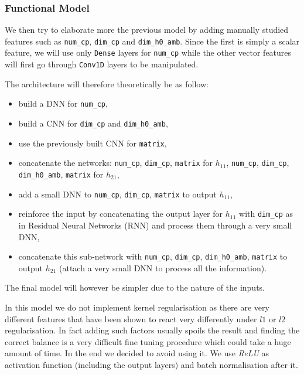    \subsubsection{Functional Model}
        We then try to elaborate more the previous model by adding manually studied features such as \texttt{num\_cp}, \texttt{dim\_cp} and \texttt{dim\_h0\_amb}. Since the first is simply a scalar feature, we will use only \texttt{Dense} layers for \texttt{num\_cp} while the other vector features will first go through \texttt{Conv1D} layers to be manipulated.
        
        The architecture will therefore theoretically be as follow:
        \begin{itemize}
            \item build a DNN for \texttt{num\_cp},
            \item build a CNN for \texttt{dim\_cp} and \texttt{dim\_h0\_amb},
            \item use the previously built CNN for \texttt{matrix},
            \item concatenate the networks:
                \subitem \texttt{num\_cp}, \texttt{dim\_cp}, \texttt{matrix} for $h_{11}$,
                \subitem \texttt{num\_cp}, \texttt{dim\_cp}, \texttt{dim\_h0\_amb}, \texttt{matrix} for $h_{21}$,
            \item add a small DNN to \texttt{num\_cp}, \texttt{dim\_cp}, \texttt{matrix} to output $h_{11}$,
            \item reinforce the input by concatenating the output layer for $h_{11}$ with \texttt{dim\_cp} as in Residual Neural Networks (RNN) and process them through a very small DNN,
            \item concatenate this sub-network with \texttt{num\_cp}, \texttt{dim\_cp}, \texttt{dim\_h0\_amb}, \texttt{matrix} to output $h_{21}$ (attach a very small DNN to process all the information).
        \end{itemize}
        The final model will however be simpler due to the nature of the inputs.
        
        In this model we do not implement kernel regularisation as there are very different features that have been shown to react very differently under $l1$ or $l2$ regularisation. In fact adding such factors usually spoils the result and finding the correct balance is a very difficult fine tuning procedure which could take a huge amount of time. In the end we decided to avoid using it. We use \textit{ReLU} as activation function (including the output layers) and batch normalisation after it.
        
